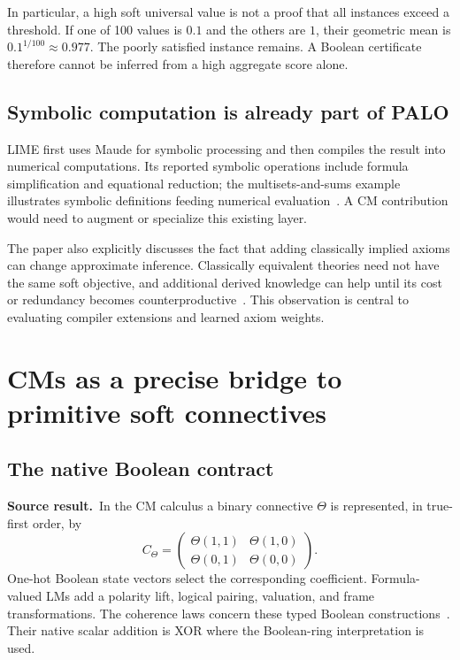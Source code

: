 \documentclass[11pt,a4paper]{article}
\theoremstyle{remark}
\newcommand{\sourceclaim}{\textbf{Source result.}\ }
\begin{document}
In particular, a high soft universal value is not a proof that all instances exceed a threshold. If one of 100 values is $0.1$ and the others are $1$, their geometric mean is $0.1^{1/100}\approx0.977$. The poorly satisfied instance remains. A Boolean certificate therefore cannot be inferred from a high aggregate score alone.

\subsection{Symbolic computation is already part of PALO}
LIME first uses Maude for symbolic processing and then compiles the result into numerical computations. Its reported symbolic operations include formula simplification and equational reduction; the multisets-and-sums example illustrates symbolic definitions feeding numerical evaluation~\cite[Section 4, pp.~27--30 and 41--43]{palo}. A CM contribution would need to augment or specialize this existing layer.

The paper also explicitly discusses the fact that adding classically implied axioms can change approximate inference. Classically equivalent theories need not have the same soft objective, and additional derived knowledge can help until its cost or redundancy becomes counterproductive~\cite[Section 3.6 and p.~43]{palo}. This observation is central to evaluating compiler extensions and learned axiom weights.

\section{CMs as a precise bridge to primitive soft connectives}
\subsection{The native Boolean contract}
\sourceclaim In the CM calculus a binary connective $\Theta$ is represented, in true-first order, by
\[
C_\Theta=\begin{pmatrix}
\Theta(1,1)&\Theta(1,0)\\
\Theta(0,1)&\Theta(0,0)
\end{pmatrix}.
\]
One-hot Boolean state vectors select the corresponding coefficient. Formula-valued LMs add a polarity lift, logical pairing, valuation, and frame transformations. The coherence laws concern these typed Boolean constructions~\cite[Sections 2--6]{lm}. Their native scalar addition is XOR where the Boolean-ring interpretation is used.
\end{document}

